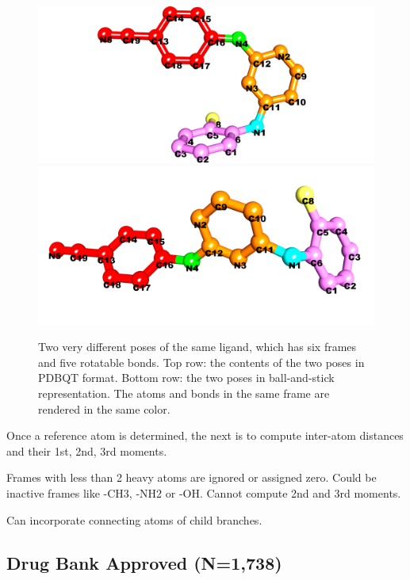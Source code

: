 \documentclass[twocolumn]{svjour3}          %
\begin{document}
\begin{figure}
\endminipage
\\
\centering
\includegraphics[width=1.36\textwidth,natwidth=1904,natheight=894]{../usrt/T27CrystalStructure.png}
\endminipage
{}
\centering
\includegraphics[width=1.36\textwidth,natwidth=1904,natheight=894]{../usrt/T27DockedStructure.png}
\endminipage
\caption{Two very different poses of the same ligand, which has six frames and five rotatable bonds. Top row: the contents of the two poses in PDBQT format. Bottom row: the two poses in ball-and-stick representation. The atoms and bonds in the same frame are rendered in the same color.}
\label{fig:T27}
\end{figure}

Once a reference atom is determined, the next is to compute inter-atom distances and their 1st, 2nd, 3rd moments.

Frames with less than 2 heavy atoms are ignored or assigned zero. Could be inactive frames like -CH3, -NH2 or -OH. Cannot compute 2nd and 3rd moments.

Can incorporate connecting atoms of child branches.

\subsection{Drug Bank Approved (N=1,738)}
\end{document}
